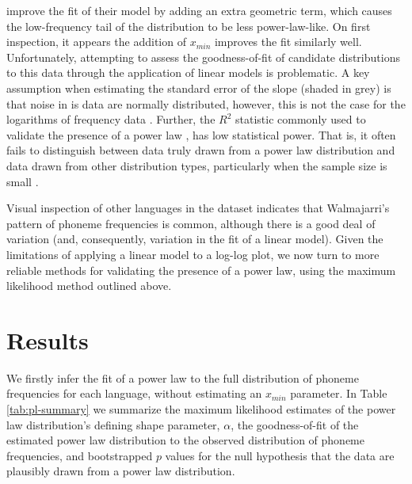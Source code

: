 \textcite{tambovtsev_phoneme_2007} improve the fit of their model by adding an extra geometric term, which causes the low-frequency tail of the distribution to be less power-law-like. On first inspection, it appears the addition of \(x_{min}\) improves the fit similarly well. Unfortunately, attempting to assess the goodness-of-fit of candidate distributions to this data through the application of linear models is problematic. A key assumption when estimating the standard error of the slope (shaded in grey) is that noise in is data are normally distributed, however, this is not the case for the logarithms of frequency data \autocite[ p.~691]{clauset_power-law_2009}. Further, the \(R^2\) statistic commonly used to validate the presence of a power law \autocite[including by][]{tambovtsev_phoneme_2007}, has low statistical power. That is, it often fails to distinguish between data truly drawn from a power law distribution and data drawn from other distribution types, particularly when the sample size is small \autocite[ p.~691]{clauset_power-law_2009}.

Visual inspection of other languages in the dataset indicates that Walmajarri's pattern of phoneme frequencies is common, although there is a good deal of variation (and, consequently, variation in the fit of a linear model). Given the limitations of applying a linear model to a log-log plot, we now turn to more reliable methods for validating the presence of a power law, using the maximum likelihood method outlined above.

\hypertarget{results}{%
\section{Results}\label{results}}

We firstly infer the fit of a power law to the full distribution of phoneme frequencies for each language, without estimating an \(x_{min}\) parameter. In Table \ref{tab:pl-summary} we summarize the maximum likelihood estimates of the power law distribution's defining shape parameter, \(\alpha\), the goodness-of-fit of the estimated power law distribution to the observed distribution of phoneme frequencies, and bootstrapped \(p\) values for the null hypothesis that the data are plausibly drawn from a power law distribution.

